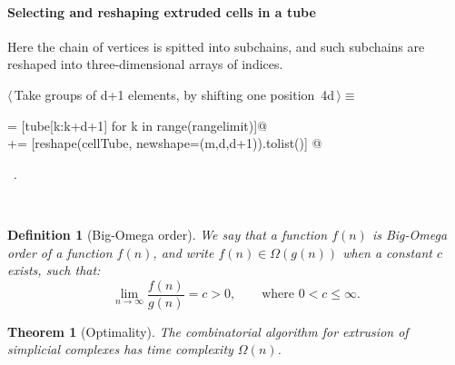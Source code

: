 \documentclass[11pt,oneside]{article}	%
\newtheorem{definition}{Definition}
\newtheorem{theorem}{Theorem}
\begin{document}
\paragraph{Selecting and reshaping extruded cells in a tube}
Here the chain of vertices is spitted into subchains, and such subchains are reshaped into three-dimensional arrays of indices.
\begin{flushleft} \small
\begin{minipage}{\linewidth} \label{scrap4}
\protect{}$\langle\,$Take groups of d+1 elements, by shifting one position\nobreak\ {\footnotesize 4d}$\,\rangle\equiv$
\vspace{-1ex}
\begin{list}{}{} \item
\mbox{}\verb@cellTube = [tube[k:k+d+1] for k in range(rangelimit)]@\\
\mbox{}\verb@outcells += [reshape(cellTube, newshape=(m,d,d+1)).tolist()]   @{\NWsep}
\end{list}
\vspace{-1ex}
\footnotesize\addtolength{\baselineskip}{-1ex}
\begin{list}{}{\setlength{\itemsep}{-\parsep}\setlength{\itemindent}{-\leftmargin}}
\item \NWtxtMacroRefIn\ .
\end{list}
\end{minipage}\\[4ex]
\end{flushleft}



\begin{definition}[Big-Omega order]
We say that a function $f(n)$ is \emph{Big-Omega} order of a function $f(n)$, and write 
$f(n) \in \Omega(g(n))$ when a constant $c$ exists, such that:
\[
\lim_{n\to\infty} \frac{f(n)}{g(n)}=c>0,\qquad \mbox{where\ } 0<c\leq\infty.
\]
\end{definition}



\begin{theorem}[Optimality]
The combinatorial algorithm for extrusion of simplicial complexes has time complexity $\Omega(n)$.
\end{theorem}
\end{document}

